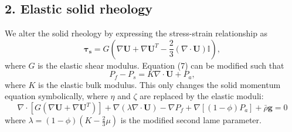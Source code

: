 \documentclass[9pt,fleqn,twoside]{article}
\theoremstyle{plain}
\theoremstyle{definition}
\theoremstyle{remark}
\begin{document}
 \subsection{2. Elastic solid rheology}
We alter the solid rheology  by expressing the stress-strain relationship as
\begin{equation}
\mathbf{\tau_s} = G \left( \nabla \mathbf{U} + \nabla \mathbf{U}^{T} - \frac{2}{3} (\nabla \cdot \mathbf{U}) \mathbb{I} \right),
\end{equation}
where $G$ is the elastic shear modulus. Equation (7) can be modified such that
\begin{equation}
P_f - P_s = K \nabla \cdot \mathbf{U} + P_a,
\end{equation} 
where $K$ is the elastic bulk modulus. This only changes the solid momentum equation symbolically, where $\eta$ and $\zeta$ are replaced by the elastic moduli:
\begin{equation}
\nabla \cdot [ G (\nabla \mathbf{U} + \nabla\mathbf{U}^{T} )]  + \nabla \left( \lambda  \nabla \cdot \mathbf{U}  \right)  - \nabla P_f + \nabla[(1 - \phi)P_a] + \bar{\rho} \mathbf{g} = 0
\end{equation}
where $\lambda = (1 - \phi)(K - \frac{2}{3} \mu)$ is the modified second lame parameter.
\end{document}

